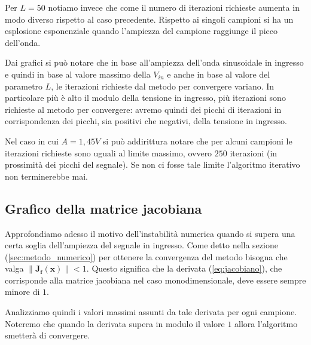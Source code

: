 			Per $L = 50$ notiamo invece che come il numero di iterazioni richieste aumenta in modo diverso rispetto al caso precedente. Rispetto ai singoli campioni si ha un esplosione esponenziale quando l'ampiezza del campione raggiunge il picco dell'onda.
			\graficospace
			\graficospace
			
			Dai grafici si può notare che in base all'ampiezza dell'onda sinusoidale in ingresso e quindi in base al valore massimo della $V_{in}$ e anche in base al valore del parametro $L$, le iterazioni richieste dal metodo per convergere variano. In particolare più è alto il modulo della tensione in ingresso, più iterazioni sono richieste al metodo per convergere: avremo quindi dei picchi di iterazioni in corrispondenza dei picchi, sia positivi che negativi, della tensione in ingresso.
			
			Nel caso in cui $A = 1,45V$ si può addirittura notare che per alcuni campioni le iterazioni richieste sono uguali al limite massimo, ovvero $250$ iterazioni (in prossimità dei picchi del segnale). Se non ci fosse tale limite l'algoritmo iterativo non terminerebbe mai.
			\pagebreak
			
		\subsection{Grafico della matrice jacobiana}
			Approfondiamo adesso il motivo dell'instabilità numerica quando si supera una certa soglia dell'ampiezza del segnale in ingresso. Come detto nella sezione (\ref{sec:metodo_numerico}) per ottenere la convergenza del metodo bisogna che valga $\lVert\mathbf{J_{f}(x)}\rVert < 1$. Questo significa che la derivata (\ref{eq:jacobiano}), che corrisponde alla matrice jacobiana nel caso monodimensionale, deve essere sempre minore di $1$.
			
			Analizziamo quindi i valori massimi assunti da tale derivata per ogni campione. Noteremo che quando la derivata supera in modulo il valore $1$ allora l'algoritmo smetterà di convergere.
			
			\graficospace
			\graficospace
			\graficospace
			
